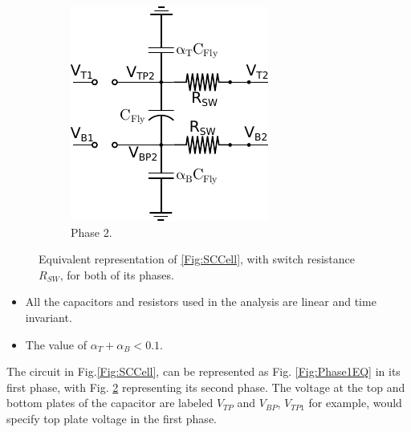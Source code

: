 \documentclass[conference]{IEEEtran}
\begin{document}
\begin{figure}
\begin{subfigure}{0.43\linewidth}
			\includegraphics[width=\linewidth]{Figures/Phase2EQ.pdf}
			\caption{Phase 2.}
			\label{Fig:Phase2EQ}
		\end{subfigure}
		\caption{Equivalent representation of \ref{Fig:SCCell}, with switch resistance $R_{SW}$, for both of its phases.}
	\end{figure}
	
	\begin{itemize}
		\item All the capacitors and resistors used in the analysis are linear and time invariant.
		\item The value of $\alpha_T + \alpha_B < 0.1$.
	\end{itemize}
	The circuit in Fig.\ref{Fig:SCCell}, can be represented as Fig. \ref{Fig:Phase1EQ} in its first phase, with Fig. \ref{Fig:Phase2EQ} representing its second phase. The voltage at the top and bottom plates of the capacitor are labeled $V_{TP}$ and $V_{BP}$, $V_{TP1}$ for example, would specify top plate voltage in the first phase.
	
	
	
\end{document}
